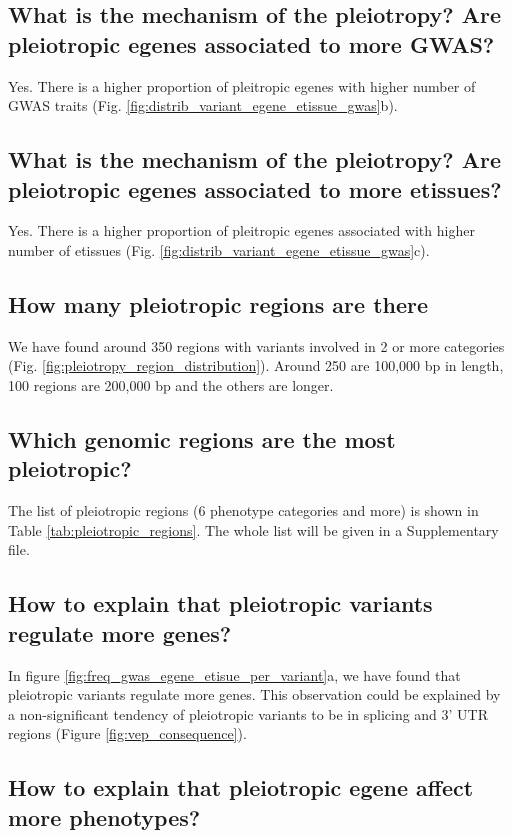\subsection*{What is the mechanism of the pleiotropy? Are pleiotropic egenes associated to more GWAS?}

Yes. There is a higher proportion of pleitropic egenes with higher number of GWAS traits (Fig. \ref{fig:distrib_variant_egene_etissue_gwas}b).

\subsection*{What is the mechanism of the pleiotropy? Are pleiotropic egenes associated to more etissues?}

Yes. There is a higher proportion of pleitropic egenes associated with higher number of etissues (Fig. \ref{fig:distrib_variant_egene_etissue_gwas}c).

\subsection*{How many pleiotropic regions are there}

We have found around 350 regions with variants involved in 2 or more categories (Fig. \ref{fig:pleiotropy_region_distribution}).
Around 250 are 100,000 bp in length, 100 regions are 200,000 bp and the others are longer.

\subsection*{Which genomic regions are the most pleiotropic?}

The list of pleiotropic regions (6 phenotype categories and more) is shown in Table \ref{tab:pleiotropic_regions}. The whole list will be given in a Supplementary file.

\subsection*{How to explain that pleiotropic variants regulate more genes?}

In figure \ref{fig:freq_gwas_egene_etisue_per_variant}a, we have found that pleiotropic variants regulate more genes.
This observation could be explained by a non-significant tendency of pleiotropic variants to be in splicing and 3' UTR regions (Figure \ref{fig:vep_consequence}).

\subsection*{How to explain that pleiotropic egene affect more phenotypes?}

